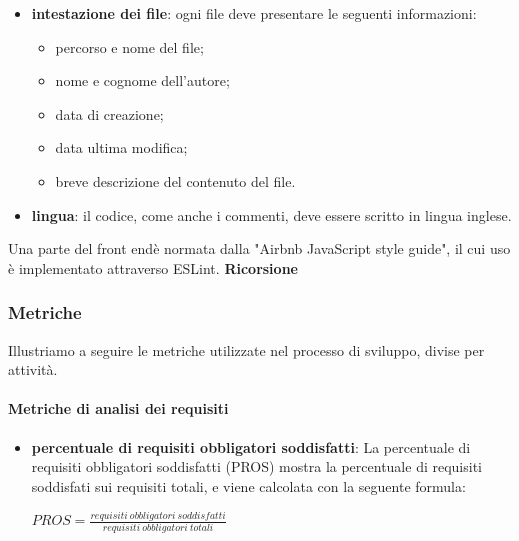 \begin{itemize}
					\item \textbf{intestazione dei file}: ogni file deve presentare le seguenti informazioni:
						\begin{itemize}
							\item percorso e nome del file;
							\item nome e cognome dell'autore;
							\item data di creazione;
							\item data ultima modifica;
							\item breve descrizione del contenuto del file.
						\end{itemize}
					\item \textbf{lingua}: il codice, come anche i commenti, deve essere scritto 
						in lingua inglese.
				\end{itemize}
			Una parte del front end\glosp è normata dalla "Airbnb JavaScript style 
			guide", il cui uso è implementato attraverso ESLint\glo. \newline \newline
			\noindent\textbf{Ricorsione}  \mbox{}\\
			
			
			
			
	\subsubsection{Metriche}
	Illustriamo a seguire le metriche utilizzate nel processo di sviluppo, divise per attività.
		\paragraph{Metriche di analisi dei requisiti}
		\begin{itemize}
			\item \textbf{percentuale di requisiti obbligatori soddisfatti}:
			La percentuale di requisiti obbligatori soddisfatti (PROS) mostra la percentuale di requisiti soddisfati sui requisiti totali, e viene calcolata con la seguente formula:	
			\begin{center}
				$ PROS = \frac{requisiti\ obbligatori\ soddisfatti}{requisiti\ obbligatori\ totali}$
			\end{center}		
		\end{itemize}		
